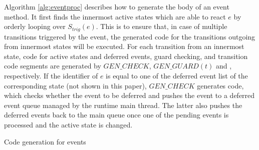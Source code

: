 Algorithm \ref{alg:eventproc} describes how to generate the body of an event method. 
It first finds the innermost active states which are able to react $e$ by orderly looping over $S_{trig}(e)$.
This is to ensure that, in case of multiple transitions triggered by the event, the generated code for the transitions outgoing from innermost states will be executed.    
For each transition from an innermost state, code for active states and deferred events, guard checking, and transition code segments are generated by $GEN\_CHECK$, $GEN\_GUARD(t)$ and , respectively. 
If the identifier of $e$ is equal to one of the deferred event list of the corresponding state (not shown in this paper), $GEN\_CHECK$ generates code, which checks whether the event to be deferred and pushes the event to a deferred event queue managed by the runtime main thread.
The latter also pushes the deferred events back to the main queue once one of the pending events is processed and the active state is changed. 

\begin{algorithm}[]
	\linespread{0}
	\caption{Code generation for events
		\label{alg:eventproc}}
	\begin{algorithmic}[1]
		\scriptsize
			\EndFor
		\EndFor			
		\EndProcedure	
	\end{algorithmic}
\end{algorithm}


